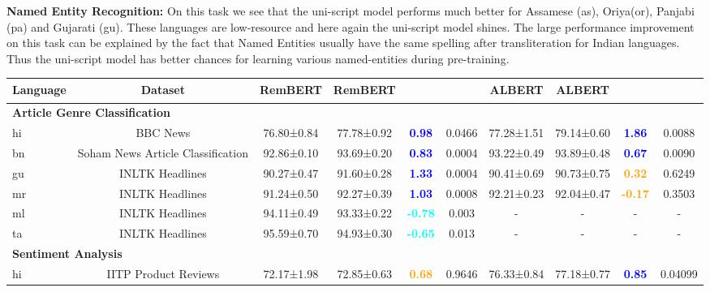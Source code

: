 \documentclass[11pt]{article}
\begin{document}
\textbf{Named Entity Recognition:}
On this task we see that the uni-script model performs much better for Assamese (as), Oriya(or), Panjabi (pa) and Gujarati (gu). These languages are low-resource and here again the uni-script model shines. The large performance improvement on this task can be explained by the fact that Named Entities usually have the same spelling after transliteration for Indian languages. Thus the uni-script model has better chances for learning various named-entities during pre-training.

\begin{table*}[hbt!]
\centering
\begin{adjustbox}{max width=\textwidth}
\small
\begin{tabular}{l c| c c c c| c c c c}
\toprule[2pt]
\textbf{Language} & \textbf{Dataset}  & RemBERT\textsubscript{}           & RemBERT\textsubscript{}     &\textbf{}           & \textbf{}      & ALBERT\textsubscript{}          & ALBERT\textsubscript{} &  \textbf{}           & \textbf{} \\          
\midrule[2pt]
\multicolumn{8}{l}{\textbf{Article Genre Classification}}\\
hi          & BBC News  & 76.80±0.84& 77.78±0.92 & \textcolor{blue}{\textbf{0.98}} &0.0466 & 77.28±1.51 & 79.14±0.60  & \textcolor{blue}{\textbf{1.86}} & 0.0088\\
bn          & Soham News Article Classification & 92.86±0.10 & 93.69±0.20 & \textcolor{blue}{\textbf{0.83}} &0.0004 & 93.22±0.49 & 93.89±0.48  & \textcolor{blue}{\textbf{0.67}} & 0.0090\\
gu          & INLTK Headlines  & 90.27±0.47 & 91.60±0.28 & \textcolor{blue}{\textbf{1.33}} &0.0004 & 90.41±0.69 & 90.73±0.75   &\textcolor{orange}{\textbf{0.32}} & 0.6249\\
mr          & INLTK Headlines  & 91.24±0.50 & 92.27±0.39 & \textcolor{blue}{\textbf{1.03}} & 0.0008 &  92.21±0.23 & 92.04±0.47  &\textcolor{orange}{\textbf{-0.17}} & 0.3503\\
ml          & INLTK Headlines  & 94.11±0.49 & 93.33±0.22 & \textcolor{cyan}{\textbf{-0.78}} &0.003 &- &- &- &-\\
ta          & INLTK Headlines  & 95.59±0.70 & 94.93±0.30 & \textcolor{cyan}{\textbf{-0.65}} &0.013 &- &- &- &-\\
\midrule[2pt] 
\multicolumn{8}{l}{\textbf{Sentiment Analysis}}\\
hi          & IITP Product Reviews & 72.17±1.98 & 72.85±0.63 & \textcolor{orange}{\textbf{0.68}} &0.9646 & 76.33±0.84 & 77.18±0.77    & \textcolor{blue}{\textbf{0.85}} & 0.04099 \\

\end{tabular}
\end{adjustbox}
\end{table*}
\end{document}
